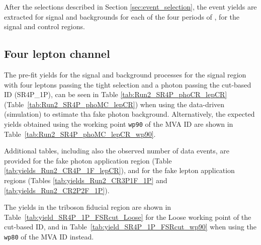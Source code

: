\label{sec:yields}
After the selections described in Section \ref{sec:event_selection}, the event yields are extracted for signal and backgrounds for each of the four periods of , for the signal and control regions.

\subsection{Four lepton channel}
The pre-fit yields for the signal and background processes for the signal region
with four leptons passing the tight selection and a photon passing the cut-based ID (SR4P\_1P),
can be seen in Table \ref{tab:Run2_SR4P_phoCR_lepCR} (Table~\ref{tab:Run2_SR4P_phoMC_lepCR})
when using the data-driven (simulation) to estimate tha fake photon background.
Alternatively, the expected yields obtained using the
working point \texttt{wp90} of the MVA ID are shown in Table~\ref{tab:Run2_SR4P_phoMC_lepCR_wp90}.

Additional tables, including also the observed number of data events, are provided
for the fake photon application region (Table \ref{tab:yields_Run2_CR4P_1F_lepCR}),
and for the fake lepton application regions (Tables \ref{tab:yields_Run2_CR3P1F_1P} and \ref{tab:yields_Run2_CR2P2F_1P}).

The yields in the triboson fiducial region are shown
in Table~\ref{tab:yield_SR4P_1P_FSRcut_Loose} for the Loose working point of the cut-based ID,
and in Table~\ref{tab:yield_SR4P_1P_FSRcut_wp90} when using the \texttt{wp80} of the MVA ID instead.


